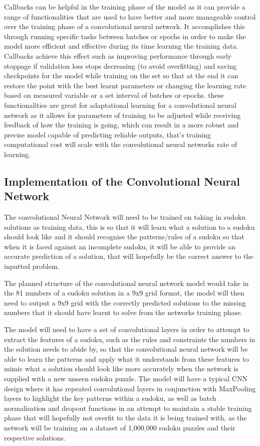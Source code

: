 \documentclass[]{final_report}
\begin{document}
Callbacks can be helpful in the training phase of the model as it can provide a range of functionalities that are used to have better and more manageable control over the training phase of a convolutional neural network. It accomplishes this through running specific tasks between batches or epochs in order to make the model more efficient and effective during its time learning the training data. Callbacks achieve this effect such as improving performance through early stoppage if validation loss stops decreasing (to avoid overfitting) and saving checkpoints for the model while training on the set so that at the end it can restore the point with the best learnt parameters or changing the learning rate based on measured variable or a set interval of batches or epochs. these functionalities are great for adaptational learning for a convolutional neural network as it allows for parameters of training to be adjusted while receiving feedback of how the training is going, which can result in a more robust and precise model capable of predicting reliable outputs, that's training computational cost will scale with the convolutional neural networks rate of learning. 

\subsection{Implementation of the Convolutional Neural Network}

The convolutional Neural Network will need to be trained on taking in sudoku solutions as training data, this is so that it will learn what a solution to a sudoku should look like and it should recognise the patterns/rules of a sudoku so that when it is faced against an incomplete sudoku, it will be able to provide an accurate prediction of a solution, that will hopefully be the correct answer to the inputted problem. 

The planned structure of the convolutional neural network model would take in the 81 numbers of a sudoku solution in a 9x9 grid format, the model will then need to output a 9x9 grid with the correctly predicted solutions to the missing numbers that it should have learnt to solve from the networks training phase. 

The model will need to have a set of convolutional layers in order to attempt to extract the features of a sudoku, such as the rules and constraints the numbers in the solution needs to abide by, so that the convolutional neural network will be able to learn the patterns and apply what it understands from these features to mimic what a solution should look like more accurately when the network is supplied with a new unseen sudoku puzzle. The model will have a typical CNN design where it has repeated convolutional layers in conjunction with MaxPooling layers to highlight the key patterns within a sudoku, as well as batch normalisation and dropout functions in an attempt to maintain a stable training phase that will hopefully not overfit to the data it is being trained with, as the network will be training on a dataset of 1,000,000 sudoku puzzles and their respective solutions. 
\end{document}
